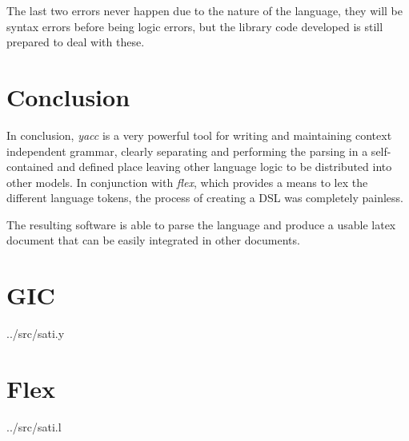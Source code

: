 \documentclass[a4paper]{report}
\begin{document}
The last two errors never happen due to the nature of the language, they will
be syntax errors before being logic errors, but the library code developed is
still prepared to deal with these.

\chapter{Conclusion}

In conclusion, \textit{yacc} is a very powerful tool for writing and
maintaining context independent grammar, clearly separating and performing the
parsing in a self-contained and defined place leaving other language logic to be
distributed into other models. In conjunction with \textit{flex}, which
provides a means to lex the different language tokens, the process of creating
a DSL was completely painless.

The resulting software is able to parse the language and produce a usable latex
document that can be easily integrated in other documents.

\appendix

\chapter{GIC}


{../src/sati.y}

\chapter{Flex}


{../src/sati.l}
\end{document}
